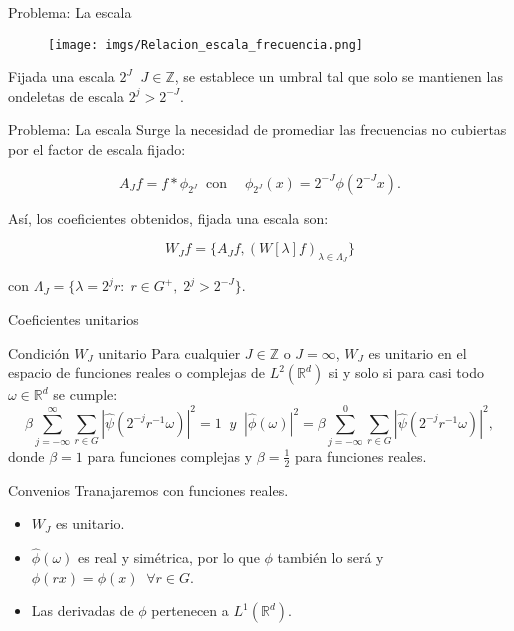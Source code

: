 \documentclass[aspectratio=43]{beamer}
\begin{document}
\begin{frame}{Problema: La escala}
  \begin{figure}
    \centering
    \texttt{[image: imgs/Relacion\_escala\_frecuencia.png]}
  \end{figure}
  Fijada una escala $2^J \; \; J\in \mathbb{Z}$, se establece un umbral tal que solo se mantienen las ondeletas de escala $2^j > 2^{-J}$.
\end{frame}

\begin{frame}{Problema: La escala}
  Surge la necesidad de promediar las frecuencias no cubiertas por el factor de escala fijado:

  \begin{equation}
    A_Jf=f \ast \phi_ {2^J} \; \; \text{con} \quad \; \phi_ {2^J}(x)=2^{-J} \phi(2^{-J}x).
  \end{equation}

  Así, los coeficientes obtenidos, fijada una escala son:

  $$W_J f=\lbrace A_Jf,(W[\lambda]f)_{\lambda \in \Lambda_J} \rbrace$$ 

  con $\Lambda_J=\lbrace \lambda=2^jr:\;r\in G^{+}, \; 2^j>2^{-J}\rbrace$.
\end{frame}

\begin{frame}{Coeficientes unitarios}
  \begin{alertblock}{Condición $W_J$ unitario}
    Para cualquier $J \in \mathbb{Z}$ o $J=\infty$, $W_J$ es unitario en el espacio de funciones reales o complejas de $L^2(\mathbb{R}^d)$ si y solo si para casi todo $\omega \in \mathbb{R}^d$ se cumple: 
    \begin{equation}\label{eq::1.2}
        \beta \sum_{j=-\infty}^\infty \sum_{r \in G} |\widehat{\psi}(2^{-j}r^{-1}\omega)|^2=1 \; \; y
        \;\;|\widehat{\phi}(\omega)|^2= \beta \sum_{j=-\infty}^0 \sum_{r\in G} |\widehat{\psi}(2^{-j}r^{-1}\omega)|^2,
    \end{equation}
    donde $\beta=1$ para funciones complejas y $\beta=\frac{1}{2}$ para funciones reales.
  \end{alertblock}
\end{frame}

\begin{frame}{Convenios}
  Tranajaremos con funciones reales.
  \begin{itemize}
    \item $W_J$ es unitario. 
    \item $\widehat{\phi}(\omega)$ es real y simétrica, por lo que $\phi$ también lo será y $\phi(rx)=\phi(x) \;\; \forall r \in G$. 
    \item Las derivadas de $\phi$ pertenecen a $L^1(\mathbb{R}^d)$.
  \end{itemize}
\end{frame}
\end{document}
